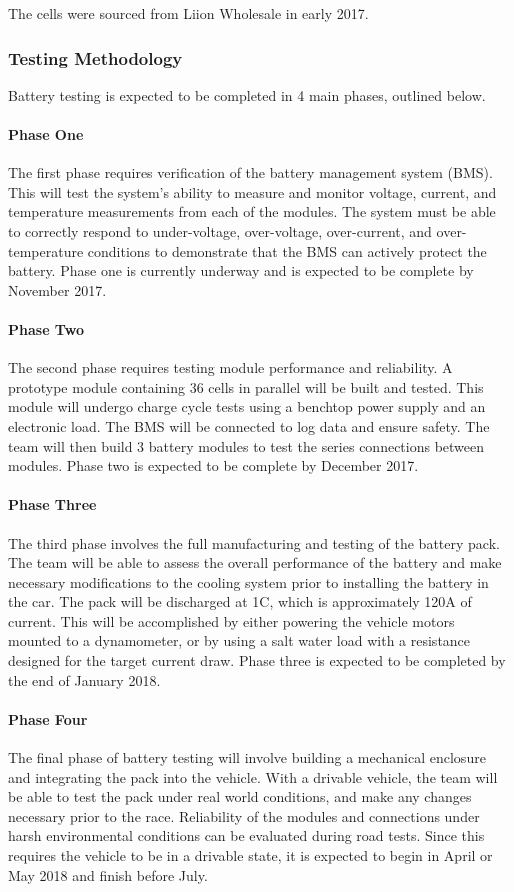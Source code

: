 \documentclass[10pt]{article}
\begin{document}
The cells were sourced from Liion Wholesale in early 2017.

\subsubsection{Testing Methodology}
Battery testing is expected to be completed in 4 main phases, outlined below.

\paragraph{Phase One}
The first phase requires verification of the battery management system (BMS). This will test the system's ability to measure and monitor voltage, current, and temperature measurements from each of the modules. The system must be able to correctly respond to under-voltage, over-voltage, over-current, and over-temperature conditions to demonstrate that the BMS can actively protect the battery. Phase one is currently underway and is expected to be complete by November 2017. 

\paragraph{Phase Two}
The second phase requires testing module performance and reliability. A prototype module containing 36 cells in parallel will be built and tested. This module will undergo charge cycle tests using a benchtop power supply and an electronic load. The BMS will be connected to log data and ensure safety. The team will then build 3 battery modules to test the series connections between modules. Phase two is expected to be complete by December 2017. 

\paragraph{Phase Three}
The third phase involves the full manufacturing and testing of the battery pack. The team will be able to assess the overall performance of the battery and make necessary modifications to the cooling system prior to installing the battery in the car. The pack will be discharged at 1C, which is approximately 120A of current. This will be accomplished by either powering the vehicle motors mounted to a dynamometer, or by using a salt water load with a resistance designed for the target current draw. Phase three is expected to be completed by the end of January 2018.

\paragraph{Phase Four}
The final phase of battery testing will involve building a mechanical enclosure and integrating the pack into the vehicle. With a drivable vehicle, the team will be able to test the pack under real world conditions, and make any changes necessary prior to the race. Reliability of the modules and connections under harsh environmental conditions can be evaluated during road tests. Since this requires the vehicle to be in a drivable state, it is expected to begin in April or May 2018 and finish before July. 


%
\end{document}
